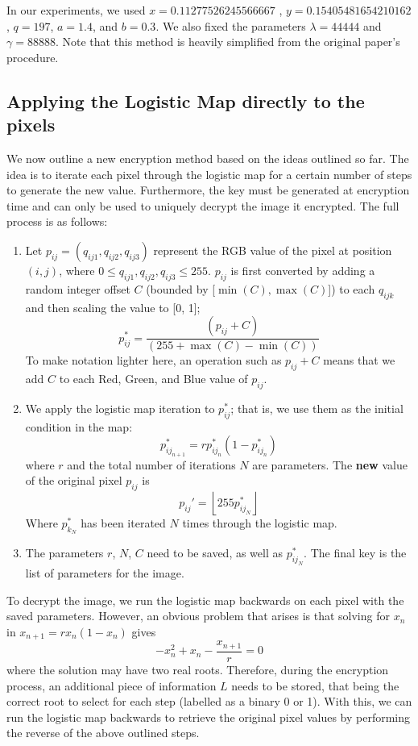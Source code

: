 \documentclass[10pt]{article}
\begin{document}
    In our experiments, we used $x = 0.11277526245566667$ , $y = 0.15405481654210162$, $q = 197$, $a=1.4$, and $b=0.3$. We also fixed the parameters $\lambda = 44444$ and $\gamma = 88888$. Note that this method is heavily simplified from the original paper's procedure.
    
    \subsection{Applying the Logistic Map directly to the pixels} \label{ssec:n2}
    
    We now outline a new encryption method based on the ideas outlined so far. The idea is to iterate each pixel through the logistic map for a certain number of steps to generate the new value. Furthermore, the key must be generated at encryption time and can only be used to uniquely decrypt the image it encrypted. The full process is as follows:
    
    \begin{enumerate}
        \item Let $p_{ij} = (q_{ij1}, q_{ij2}, q_{ij3})$ represent the RGB value of the pixel at position $(i, j)$, where $0 \leq q_{ij1}, q_{ij2}, q_{ij3} \leq 255$. $p_{ij}$ is first converted by adding a random integer offset $C$ (bounded by [$\min{(C)}, \max{(C)}$]) to each $q_{ijk}$ and then scaling the value to [0, 1]; $$p_{ij}^* = \frac{(p_{ij} + C)}{(255 + \max{(C)}- \min{(C)})}$$
        To make notation lighter here, an operation such as $p_{ij} + C$ means that we add $C$ to each Red, Green, and Blue value of $p_{ij}$.
        
        \item We apply the logistic map iteration to $p_{ij}^*$; that is, we use them as the initial condition in the map: 
        $$p_{ij_{n+1}}^{*} = rp_{{ij}_n}^{*} (1-p_{{ij}_n}^{*})$$
        where $r$ and the total number of iterations $N$ are parameters. The \textbf{new} value of the original pixel $p_{ij}$ is
        $$p_{ij}' = \left \lfloor 255p_{{ij}_{N}}^{*} \right \rfloor$$
        Where $p_{k_{N}}^*$ has been iterated $N$ times through the logistic map.
        
        \item The parameters $r$, $N$, $C$ need to be saved, as well as $p_{{ij}_{N}}^{*}$. The final key is the list of parameters for the image.
    \end{enumerate}
    
    
    To decrypt the image, we run the logistic map backwards on each pixel with the saved parameters. However, an obvious problem that arises is that solving for $x_n$ in $x_{n+1} = rx_n(1-x_n)$ gives
    $$-x_n^2 +x_n - \frac{x_{n+1}}{r} = 0$$
    where the solution may have two real roots. Therefore, during the encryption process, an additional piece of information $L$ needs to be stored, that being the correct root to select for each step (labelled as a binary 0 or 1). With this, we can run the logistic map backwards to retrieve the original pixel values by performing the reverse of the above outlined steps.\\
    
\end{document}
